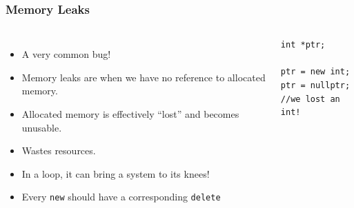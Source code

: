 \documentclass[handout]{beamer}
\begin{document}
\begin{frame}[fragile]
    \frametitle{Memory Leaks}
    \begin{columns}
        \begin{itemize}
            \item A very common bug!
            \item Memory leaks are when we have no reference to allocated
                memory.
            \item Allocated memory is effectively ``lost'' and becomes unusable.
            \item Wastes resources.
            \item In a loop, it can bring a system to its knees!
            \item Every {\tt new} should have a corresponding {\tt delete}
        \end{itemize}
        \begin{verbatim}
int *ptr;

ptr = new int;
ptr = nullptr;
//we lost an int!
        \end{verbatim}
    \end{columns}
\end{frame}
\end{document}
